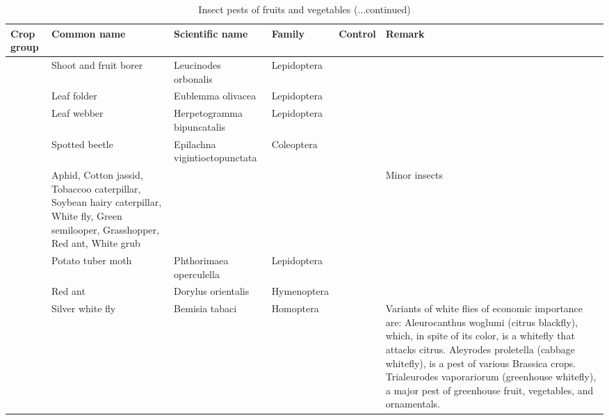 \documentclass[10pt,dvipsnames,ignorenonframetext,aspectratio=169]{beamer}
\begin{document}
\begin{frame}{}
\protect\hypertarget{section-23}{}
\begin{table}

\caption{\label{tab:unnamed-chunk-5}Insect pests of fruits and vegetables (...continued)}
\centering
\fontsize{4}{6}\selectfont
\begin{tabular}[t]{>{\raggedright\arraybackslash}p{6em}>{\raggedright\arraybackslash}p{12em}>{\raggedright\arraybackslash}p{15em}>{\raggedright\arraybackslash}p{14em}>{\raggedright\arraybackslash}p{6em}>{\raggedright\arraybackslash}p{16em}}
\toprule
Crop group & Common name & Scientific name & Family & Control & Remark\\
\midrule
 & Shoot and fruit borer & Leucinodes orbonalis & Lepidoptera &  & \\
\cmidrule{2-6}
 & Leaf folder & Eublemma olivacea & Lepidoptera &  & \\
\cmidrule{2-6}
 & Leaf webber & Herpetogramma bipuncatalis & Lepidoptera &  & \\
\cmidrule{2-6}
 & Spotted beetle & Epilachna vigintioctopunctata & Coleoptera &  & \\
\cmidrule{2-6}
\multirow{-5}{6em}{\raggedright\arraybackslash Brinjal} & Aphid, Cotton jassid, Tobaccoo caterpillar, Soybean hairy caterpillar, White fly, Green semilooper, Grasshopper, Red ant, White grub &  &  &  & Minor insects\\
\cmidrule{1-6}
 & Potato tuber moth & Phthorimaea operculella & Lepidoptera &  & \\
\cmidrule{2-6}
 & Red ant & Dorylus orientalis & Hymenoptera &  & \\
\cmidrule{2-6}
\multirow{-3}{6em}{\raggedright\arraybackslash Potato} & Silver white fly & Bemisia tabaci & Homoptera &  & Variants of white flies of economic importance are: Aleurocanthus woglumi (citrus blackfly), which, in spite of its color, is a whitefly that attacks citrus. Aleyrodes proletella (cabbage whitefly), is a pest of various Brassica crops. Trialeurodes vaporariorum (greenhouse whitefly), a major pest of greenhouse fruit, vegetables, and ornamentals.\\
\bottomrule
\end{tabular}
\end{table}
\end{frame}
\end{document}
